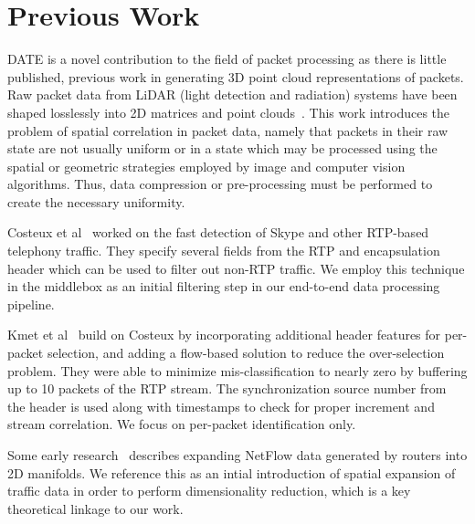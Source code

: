\section{Previous Work}

\textsc{DATE} is a novel contribution to the field of packet processing as there is little published, previous work in generating 3D point cloud representations of packets. Raw packet data from LiDAR (light detection and radiation) systems have been shaped losslessly into 2D matrices and point clouds~\cite{Tu2019point}. This work introduces the problem of spatial correlation in packet data, namely that packets in their raw state are not usually uniform or in a state which may be processed using the spatial or geometric strategies employed by image and computer vision algorithms. Thus, data compression or pre-processing must be performed to create the necessary uniformity.

Costeux et al~\cite{costeux2006detection} worked on the fast detection of Skype and other RTP-based telephony traffic. They specify several fields from the RTP and encapsulation header which can be used to filter out non-RTP traffic. We employ this technique in the middlebox as an initial filtering step in our end-to-end data processing pipeline.

Kmet et al~\cite{kmetfast} build on Costeux by incorporating additional header features for per-packet selection, and adding a flow-based solution to reduce the over-selection problem. They were able to minimize mis-classification to nearly zero by buffering up to 10 packets of the RTP stream. The synchronization source number from the header is used along with timestamps to check for proper increment and stream correlation. We focus on per-packet identification only.

Some early research~\cite{patwari2005manifold} describes expanding NetFlow data generated by routers into 2D manifolds. We reference this as an intial introduction of spatial expansion of traffic data in order to perform dimensionality reduction, which is a key theoretical linkage to our work.
